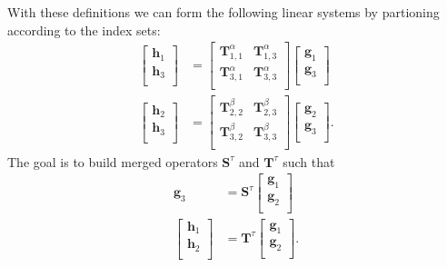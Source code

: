 With these definitions we can form the following linear systems by partioning according to the index sets:
\begin{align}
    \begin{bmatrix}
        \textbf{h}_1 \\
        \textbf{h}_3 \\
    \end{bmatrix} &=
    \begin{bmatrix}
        \textbf{T}_{1,1}^{\alpha} & \textbf{T}_{1,3}^{\alpha} \\
        \textbf{T}_{3,1}^{\alpha} & \textbf{T}_{3,3}^{\alpha} \\
    \end{bmatrix}
    \begin{bmatrix}
        \textbf{g}_1 \\
        \textbf{g}_3 \\
    \end{bmatrix} \\
    \begin{bmatrix}
        \textbf{h}_2 \\
        \textbf{h}_3 \\
    \end{bmatrix} &=
    \begin{bmatrix}
        \textbf{T}_{2,2}^{\beta} & \textbf{T}_{2,3}^{\beta} \\
        \textbf{T}_{3,2}^{\beta} & \textbf{T}_{3,3}^{\beta} \\
    \end{bmatrix}
    \begin{bmatrix}
        \textbf{g}_2 \\
        \textbf{g}_3 \\
    \end{bmatrix}.
\end{align}
The goal is to build merged operators $\textbf{S}^{\tau}$ and $\textbf{T}^{\tau}$ such that
\begin{align}
    \textbf{g}_3 &= \textbf{S}^{\tau}
    \begin{bmatrix}
        \textbf{g}_1 \\
        \textbf{g}_2 \\
    \end{bmatrix} \\
    \begin{bmatrix}
        \textbf{h}_1 \\
        \textbf{h}_2 \\
    \end{bmatrix} &=
    \textbf{T}^{\tau}
    \begin{bmatrix}
        \textbf{g}_1 \\
        \textbf{g}_2 \\
    \end{bmatrix}.
\end{align}

